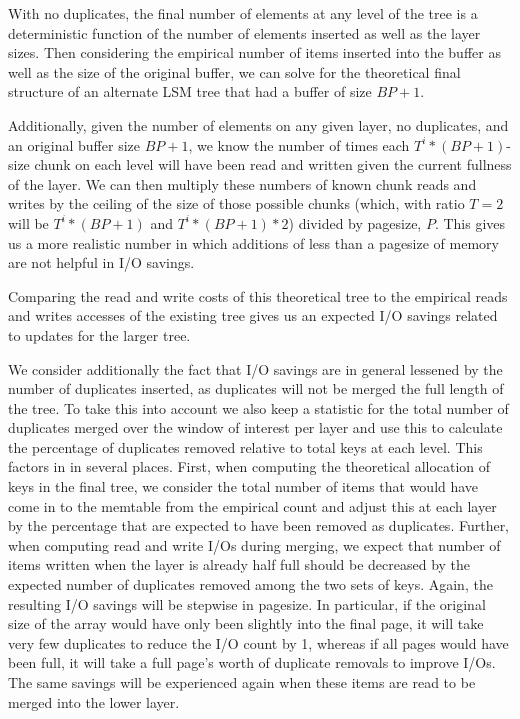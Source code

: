 \documentclass{sig-alternate-05-2015}
\begin{document}
With no duplicates, the final number of elements at any level of the tree is a deterministic function of the number of elements
inserted as well as the layer sizes. Then considering the empirical number of items inserted into the buffer as well as the 
size of the original buffer, we can solve for the theoretical final structure of an alternate LSM tree that had a buffer of size 
$BP + 1$.

Additionally, given the number of elements on any given layer, no duplicates, and an original buffer size $BP+1$, we know the number of times each $T^{i}*(BP+1)$-size chunk on each level will have been read and written given the current fullness of the layer. We can then multiply these numbers of known chunk reads and writes by the ceiling of the size of those possible chunks (which, with ratio $T=2$ will be $T^{i}*(BP+1)$ and $T^{i}*(BP+1)*2$) divided by pagesize, $P$. This gives us a more realistic number in which additions of less than a pagesize of memory are not helpful in I/O savings. 

Comparing the read and write costs of this theoretical tree to the empirical reads and writes accesses of the existing
tree gives us an expected I/O savings related to updates for the larger tree.

We consider additionally the fact that I/O savings are in general lessened by the number
of duplicates inserted, as duplicates will not be merged the full length of the
tree. To take this into account we also keep a statistic for the total number
of duplicates merged over the window of interest per layer and use this to calculate the percentage of duplicates removed
relative to total keys at each level. This factors in in several places. First, when computing the theoretical allocation
of keys in the final tree, we consider the total number of items that would have come in to the memtable from the empirical
count and adjust this at each layer by the percentage that are expected to have been removed as duplicates.
Further, when computing read and write I/Os during merging, we expect that number of items written when the layer is already half full should be decreased by the expected number of duplicates removed among the two sets of keys. Again, the resulting I/O savings will be stepwise in pagesize. In particular, if the original size of the array would have only been slightly into the final page, it will take very few duplicates to reduce the I/O count by 1, whereas if all pages would have been full, it will take a full page's worth of duplicate removals to improve I/Os. The same savings will be experienced again when these items are read to be merged into the lower layer.
\end{document}
